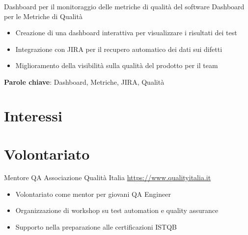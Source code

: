 \documentclass[a4paper, serif, 10pt]{moderncv}
\begin{document}
        {Dashboard per il monitoraggio delle metriche di qualità del software}
        {Dashboard per le Metriche di Qualità}
        {}
        {}
        {\begin{itemize}
\item Creazione di una dashboard interattiva per visualizzare i risultati dei test
\item Integrazione con JIRA per il recupero automatico dei dati sui difetti
\item Miglioramento della visibilità sulla qualità del prodotto per il team
\end{itemize}
\textbf{Parole chiave}: Dashboard, Metriche, JIRA, Qualità}
\section{Interessi}

\section{Volontariato}

        {Mentore QA}
        {Associazione Qualità Italia}
        {\url{https://www.qualityitalia.it}}
        {}
        {\begin{itemize}
\item Volontariato come mentor per giovani QA Engineer
\item Organizzazione di workshop su test automation e quality assurance
\item Supporto nella preparazione alle certificazioni ISTQB
\end{itemize}}
    
\end{document}
